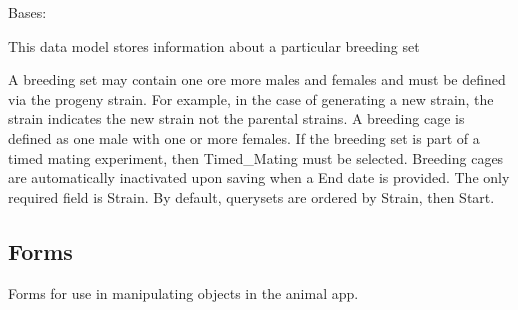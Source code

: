 \documentclass[letterpaper,10pt,english]{sphinxmanual}
\begin{document}

\begin{fulllineitems}
\label{api:animal.models.Breeding}
Bases: 

This data model stores information about a particular breeding set

A breeding set may contain one ore more males and females and must be defined via the progeny strain.  For example, in the case of generating a new strain, the strain indicates the new strain not the parental strains.  A breeding cage is defined as one male with one or more females.  If the breeding set is part of a timed mating experiment, then Timed\_Mating must be selected.  Breeding cages are automatically inactivated upon saving when a End date is provided.  The only required field is Strain.  By default, querysets are ordered by Strain, then Start.

\end{fulllineitems}



\subsection{Forms}
\label{api:id2}\label{api:module-animal.forms}
Forms for use in manipulating objects in the animal app.
\end{document}
